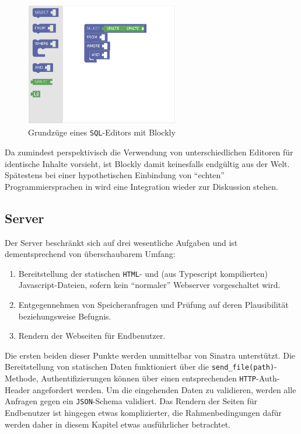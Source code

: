 \begin{figure}[t]
  \centering \includegraphics[width=0.6\textwidth]{images/blockly/first-steps}
  \caption{Grundzüge eines \texttt{SQL}-Editors mit Blockly}
  \label{fig:blockly-eval-sql}
\end{figure}

Da \idename{} zumindest perspektivisch die Verwendung von unterschiedlichen Editoren für identische Inhalte vorsieht, ist Blockly damit keinesfalls endgültig aus der Welt. Spätestens bei einer hypothetischen Einbindung von "`echten"' Programmiersprachen in \idename{} wird eine Integration wieder zur Diskussion stehen.

\subsection{Server}

Der Server beschränkt sich auf drei wesentliche Aufgaben und ist dementsprechend von überschaubarem Umfang:

\begin{enumerate}[noitemsep]
\item Bereitstellung der statischen \texttt{HTML}- und (aus Typescript kompilierten) Javascript-Dateien, sofern kein "`normaler"' Webserver vorgeschaltet wird.
\item Entgegennehmen von Speicheranfragen und Prüfung auf deren Plausibilität beziehungsweise Befugnis.
\item Rendern der Webseiten für Endbenutzer.
\end{enumerate}

Die ersten beiden dieser Punkte werden unmittelbar von Sinatra unterstützt. Die Bereitstellung von statischen Daten funktioniert über die \texttt{send\_file(path)}-Methode, Authentifizierungen können über einen entsprechenden \texttt{HTTP}-Auth-Header angefordert werden. Um die eingehenden Daten zu validieren, werden alle Anfragen gegen ein \texttt{JSON}-Schema validiert. Das Rendern der Seiten für Endbenutzer ist hingegen etwas komplizierter, die Rahmenbedingungen dafür werden daher in diesem Kapitel etwas ausführlicher betrachtet.

